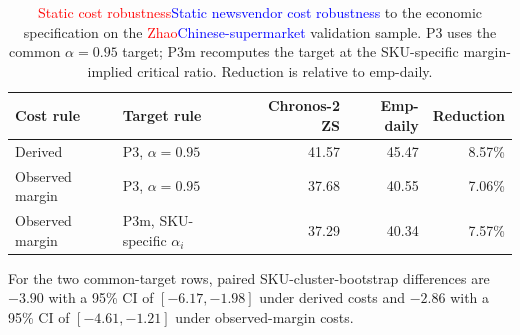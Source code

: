 \documentclass[msom,dblanonrev]{informs4}
\newcommand{\add}[1]{\textcolor{blue}{#1}}
\newcommand{\reduce}[1]{\textcolor{red}{#1}\hspace{0.5em}}
\begin{document}
\begin{table}[htbp]
\caption{\reduce{Static cost robustness}\add{Static newsvendor cost robustness} to the economic specification on the \reduce{Zhao}\add{Chinese-supermarket} validation sample. P3 uses the common $\alpha=0.95$ target; P3m recomputes the target at the SKU-specific margin-implied critical ratio. Reduction is relative to emp-daily.}
\label{tab:oa_margin_cost}
\centering\small
\begin{tabular}{llrrr}
\toprule
\textbf{Cost rule} & \textbf{Target rule} & \textbf{Chronos-2 ZS} & \textbf{Emp-daily} & \textbf{Reduction} \\
\midrule
Derived & P3, $\alpha=0.95$ & 41.57 & 45.47 & 8.57\% \\
Observed margin & P3, $\alpha=0.95$ & 37.68 & 40.55 & 7.06\% \\
Observed margin & P3m, SKU-specific $\alpha_i$ & 37.29 & 40.34 & 7.57\% \\
\bottomrule
\end{tabular}
\end{table}

For the two common-target rows, paired SKU-cluster-bootstrap differences are $-3.90$ with a 95\% CI of $[-6.17,-1.98]$ under derived costs and $-2.86$ with a 95\% CI of $[-4.61,-1.21]$ under observed-margin costs.

\begin{table}[htbp]
\caption{Margin-cost sensitivity with SKU-specific critical ratios. The unit shortage cost is observed margin, the monthly holding cost is $\kappa_h c_i/12$, and each stocking target is recomputed at $\alpha_i=p_i/(p_i+h_i)$.}
\label{tab:oa_margin_kappa}
\centering\small
{}
\end{table}
\end{document}
